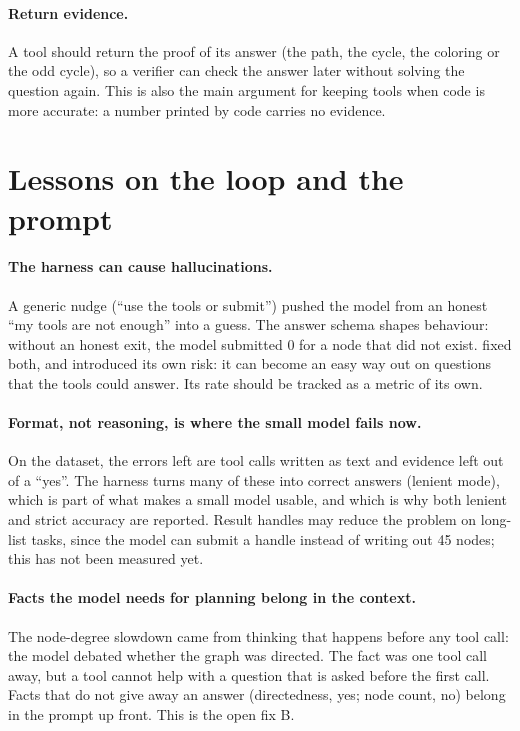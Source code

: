 \paragraph{Return evidence.} A tool should return the proof of its answer (the path, the cycle, the coloring or the
odd cycle), so a verifier can check the answer later without solving the question again. This is also the main
argument for keeping tools when code is more accurate: a number printed by code carries no evidence.

\section{Lessons on the loop and the prompt}

\paragraph{The harness can cause hallucinations.} A generic nudge (``use the tools or submit'') pushed the model from
an honest ``my tools are not enough'' into a guess. The answer schema shapes behaviour: without an honest exit, the
model submitted 0 for a node that did not exist.  fixed both, and introduced its own risk: it can
become an easy way out on questions that the tools could answer. Its rate should be tracked as a metric of its own.

\paragraph{Format, not reasoning, is where the small model fails now.} On the dataset, the errors left are tool calls
written as text and evidence left out of a ``yes''. The harness turns many of these into correct answers (lenient
mode), which is part of what makes a small model usable, and which is why both lenient and strict accuracy are
reported. Result handles may reduce the problem on long-list tasks, since the model can submit a handle instead of
writing out 45 nodes; this has not been measured yet.

\paragraph{Facts the model needs for planning belong in the context.} The node-degree slowdown came from thinking that
happens before any tool call: the model debated whether the graph was directed. The fact was one tool call away, but
a tool cannot help with a question that is asked before the first call. Facts that do not give away an answer
(directedness, yes; node count, no) belong in the prompt up front. This is the open fix B.

